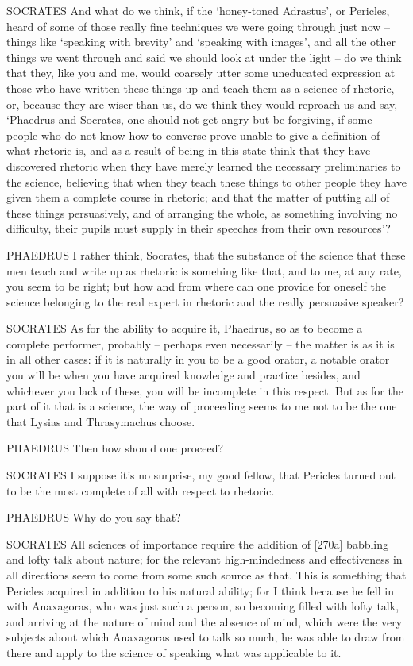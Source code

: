  SOCRATES And what do we think, if the ‘honey-toned Adrastus',
or Pericles, heard of
some of those really fine techniques we were going through just now --
things like ‘speaking with brevity' and ‘speaking with images', and all
the other things we went through and said we should look at under the
 light -- do we think that they, like you and me, would coarsely
utter some uneducated expression at those who have written these things
up and teach them as a science of rhetoric, or, because they are wiser
than us, do we think they would  reproach us and say, ‘Phaedrus
and Socrates, one should not get angry but be forgiving, if some people
who do not know how to
converse prove unable to
give a definition of what rhetoric is, and as a result of being in this
state think that they have discovered rhetoric when they have merely
learned the necessary preliminaries to the science, believing that when
they  teach these things to other people they have given them a
complete course in rhetoric; and that the matter of putting all of these
things persuasively, and of arranging the whole, as something involving
no difficulty, their pupils must supply in their speeches from their own
resources'? 

PHAEDRUS I rather think, Socrates, that the substance of the science
that these men teach and write up as rhetoric is somehing like that, and
to me, at any rate, you seem to be right; but how and from where can one
provide for oneself the science  belonging to the real expert in
rhetoric and the really persuasive speaker?

SOCRATES As for the ability to acquire it, Phaedrus, so as to become a
complete performer, probably -- perhaps even necessarily -- the matter
is as it is in all other cases: if it is naturally in you to be a good
orator, a notable orator you will be when you have acquired knowledge
and practice besides,  and whichever you lack of these, you will
be incomplete in this respect. But as for the part of it that is a
science, the way of proceeding seems to me not to be the one that Lysias
and Thrasymachus choose.

PHAEDRUS Then how should one proceed?

SOCRATES I suppose it's no surprise, my good fellow, that 
Pericles turned out to be the most complete of all with respect to
rhetoric.

PHAEDRUS Why do you say that?

SOCRATES All sciences of importance require the addition of {[}270a{]}
babbling and lofty talk
about nature; for the relevant high-mindedness and effectiveness in all
directions seem to come from some such source as that. This is something
that Pericles acquired in addition to his natural ability; for I think
because he fell in with Anaxagoras, who was just such a person, so
becoming filled with lofty talk, and arriving at the nature of 
mind and the absence of mind, which were the very subjects about which
Anaxagoras used to talk
so much, he was able to draw from there and apply to the science of
speaking what was applicable to it.

